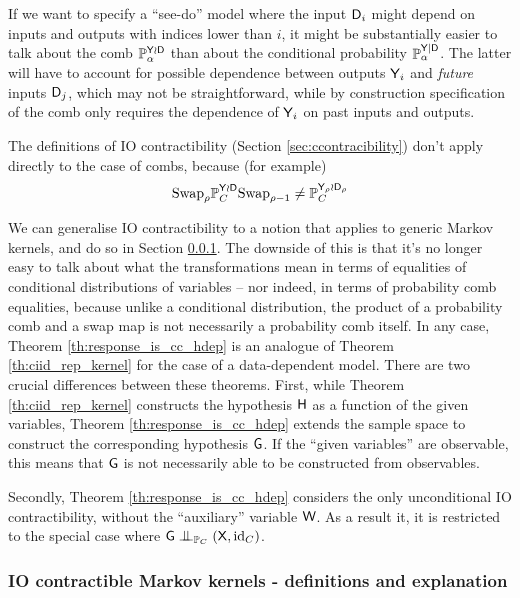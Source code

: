 If we want to specify a ``see-do'' model where the input $\mathsf{D}_i$ might depend on inputs and outputs with indices lower than $i$, it might be substantially easier to talk about the comb $\mathbb{P}_\alpha^{\mathsf{Y}\wr \mathsf{D}}$ than about the conditional probability $\mathbb{P}_\alpha^{\mathsf{Y}|\mathsf{D}}$. The latter will have to account for possible dependence between outputs $\mathsf{Y}_i$ and \emph{future} inputs $\mathsf{D}_j$, which may not be straightforward, while by construction specification of the comb only requires the dependence of $\mathsf{Y}_i$ on past inputs and outputs.

The definitions of IO contractibility (Section \ref{sec:ccontracibility}) don't apply directly to the case of combs, because (for example) 
\begin{align}
    \text{Swap}_{\rho} \mathbb{P}_C^{\mathsf{Y}\wr \mathsf{D}} \text{Swap}_{\rho-1} \neq \mathbb{P}_C^{\mathsf{Y}_{\rho}\wr \mathsf{D}_\rho}
\end{align}
 
We can generalise IO contractibility to a notion that applies to generic Markov kernels, and do so in Section \ref{sec:ccontracibile_kernel}. The downside of this is that it's no longer easy to talk about what the transformations mean in terms of equalities of conditional distributions of variables -- nor indeed, in terms of probability comb equalities, because unlike a conditional distribution, the product of a probability comb and a swap map is not necessarily a probability comb itself. In any case, Theorem \ref{th:response_is_cc_hdep} is an analogue of Theorem \ref{th:ciid_rep_kernel} for the case of a data-dependent model. There are two crucial differences between these theorems. First, while Theorem \ref{th:ciid_rep_kernel} constructs the hypothesis $\mathsf{H}$ as a function of the given variables, Theorem \ref{th:response_is_cc_hdep} extends the sample space to construct the corresponding hypothesis $\mathsf{G}$. If the ``given variables'' are observable, this means that $\mathsf{G}$ is not necessarily able to be constructed from observables.

Secondly, Theorem \ref{th:response_is_cc_hdep} considers the only unconditional IO contractibility, without the ``auxiliary'' variable $\mathsf{W}$. As a result it, it is restricted to the special case where $\RV{G}\CI_{\prob{P}_C} (\RV{X},\text{id}_C)$.

\subsubsection[IO contractible Markov kernels]{IO contractible Markov kernels - definitions and explanation}\label{sec:ccontracibile_kernel}

